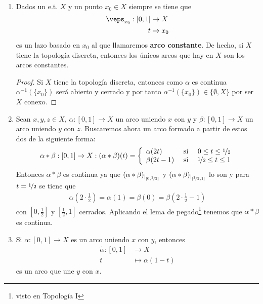 \begin{ejemplo}\
    \begin{enumerate}
        \item Dados un e.t. $X$ y un punto $x_0\in X$ siempre se tiene que
        \begin{align*}
            \veps_{x_0}:[0,1]&\to X\\
            t &\mapsto x_0
        \end{align*}
        es un lazo basado en $x_0$ al que llamaremos \textbf{arco constante}. De hecho, si $X$ tiene la topología discreta, entonces los únicos arcos que hay en $X$ son los arcos constantes.
        \begin{proof}
            Si $X$ tiene la topología discreta, entonces como $\alpha$ es continua $\alpha^{-1}(\{x_0\})$ será abierto y cerrado y por tanto $\alpha^{-1}(\{x_0\})\in\{\emptyset, X\}$ por ser $X$ conexo.
        \end{proof}


        \item Sean $x,y,z\in X$, $\alpha:[0,1]\to X$ un arco uniendo $x$ con $y$ y $\beta:[0,1]\to X$ un arco uniendo $y$ con $z$. Buscaremos ahora un arco formado a partir de estos dos de la siguiente forma:
        \begin{align*}
            \alpha\ast\beta : [0,1]\to X : (\alpha\ast\beta)(t) = \left\{ 
                \begin{array}{l c c}
                    \alpha(2t) & \text{ si } & 0 \leq t \leq \nicefrac{1}{2} \\
                    \beta(2t-1) & \text{ si } & \nicefrac{1}{2}\leq t \leq 1
                \end{array}
            \right.
        \end{align*}
        Entonces $\alpha\ast\beta$ es continua ya que $(\alpha\ast\beta)_{|_{[0,\nicefrac{1}{2}]}}$ y $(\alpha\ast\beta)_{|_{[\nicefrac{1}{2},1]}}$ lo son y para $t=\nicefrac{1}{2}$ se tiene que
        \begin{gather*}
            \alpha \left(2 \cdot \frac{1}{2}\right) = \alpha(1) = \beta(0) = \beta\left(2\cdot \frac{1}{2} -1\right)
        \end{gather*}
        con $\left[0, \frac{1}{2}\right]$ y $\left[\frac{1}{2}, 1\right]$ cerrados. Aplicando el lema de pegado\footnote{visto en Topología I} tenemos que $\alpha\ast \beta$ es continua.

        \item Si $\alpha:[0,1]\to X$ es un arco uniendo $x$ con $y$, entonces
        \begin{align*}
            \tilde{\alpha}:[0,1]&\to X\\
            t & \mapsto \alpha(1-t)
        \end{align*}
        es un arco que une $y$ con $x$.
    \end{enumerate}
\end{ejemplo}

